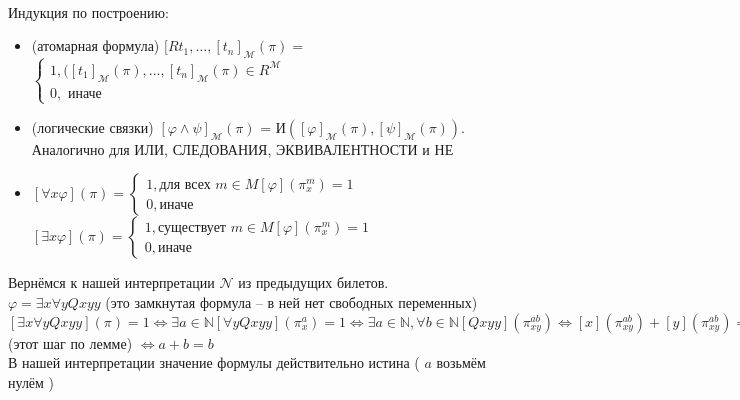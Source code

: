 \documentclass[a4paper, fleqn]{article}
\begin{document}
    \begin{definition} \ \\
        Индукция по построению:
        \begin{itemize}
            \item[(1)] (атомарная формула) 
            $[Rt_1, \ldots, [t_n]_{\mathcal{M}}(\pi) = $
            $\begin{cases}
                1, ([t_1]_{\mathcal{M}}(\pi), \ldots, 
                [t_n]_{\mathcal{M}}(\pi) ∈ R^{\mathcal{M}} \\
                0, \text{ иначе}
            \end{cases}$
            \item[(2)] (логические связки) 
            $[\varphi ∧ \psi]_{\mathcal{M}}(\pi)$ = 
            И$([\varphi]_{\mathcal{M}}(\pi), [\psi]_{\mathcal{M}}(\pi))$.
            Аналогично для ИЛИ, СЛЕДОВАНИЯ, ЭКВИВАЛЕНТНОСТИ и НЕ
            \item[(3)]
            $[∀ x \varphi](\pi) =
            \begin{cases}
                1, \text{для всех } m ∈ M [\varphi](\pi_x^m) = 1\\
                0, \text{иначе}
            \end{cases}$ \\ 
            $[∃ x \varphi](\pi) =
            \begin{cases}
                1, \text{существует } m ∈ M [\varphi](\pi_x^m) = 1\\
                0, \text{иначе}
            \end{cases}$
        \end{itemize}
    \end{definition}
    \begin{example}
        Вернёмся к нашей интерпретации $\mathcal{N}$ из предыдущих билетов. \\[9.5pt]
        $\varphi = ∃ x ∀ y Qxyy$ (это замкнутая формула -- в ней нет свободных
        переменных) \\[9.5pt]
        $[∃ x ∀ y Qxyy](\pi) = 1 ⇔ ∃ a ∈ \mathbb{N} [∀ y Qxyy](\pi_x^a) = 1
        ⇔  ∃ a ∈ \mathbb{N}, ∀ b ∈ \mathbb{N} [Qxyy](\pi^{ab}_{xy})
        ⇔ [x](\pi^{ab}_{xy}) + [y](\pi^{ab}_{xy}) = [y](\pi^{ab}_{xy})
        ⇔ \pi_x^a(x) + \pi_y^b(y) = \pi_y^b(y)$ (этот шаг по лемме) 
        $⇔ a + b = b$ \\[9.5pt]
        В нашей интерпретации значение формулы действительно истина (
            $a$ возьмём нулём
        )   
    \end{example}
\end{document}
